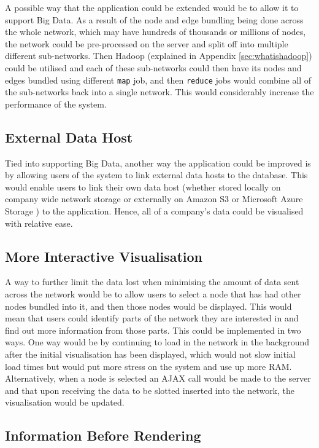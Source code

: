 \documentclass[../dissertation.tex]{subfiles}
\begin{document}
A possible way that the application could be extended would be to allow it to support Big Data. As a result of the node and edge bundling being done across the whole network, which may have hundreds of thousands or millions of nodes, the network could be pre-processed on the server and split off into multiple different sub-networks. Then Hadoop \cite{hadoop} (explained in Appendix \ref{sec:whatishadoop}) could be utilised and each of these sub-networks could then have its nodes and edges bundled using different \texttt{map} job, and then \texttt{reduce} jobs would combine all of the sub-networks back into a single network. This would considerably increase the performance of the system.

\subsection{External Data Host}

Tied into supporting Big Data, another way the application could be improved is by allowing users of the system to link external data hosts to the database. This would enable users to link their own data host (whether stored locally on company wide network storage or externally on Amazon S3 \cite{amazons3} or Microsoft Azure Storage \cite{msftazure}) to the application. Hence, all of a company's data could be visualised with relative ease.

\subsection{More Interactive Visualisation}

A way to further limit the data lost when minimising the amount of data sent across the network would be to allow users to select a node that has had other nodes bundled into it, and then those nodes would be displayed. This would mean that users could identify parts of the network they are interested in and find out more information from those parts. This could be implemented in two ways. One way would be by continuing to load in the network in the background after the initial visualisation has been displayed, which would not slow initial load times but would put more stress on the system and use up more RAM. Alternatively, when a node is selected an AJAX call would be made to the server and that upon receiving the data to be slotted inserted into the network, the visualisation would be updated.

\subsection{Information Before Rendering}
\end{document}

